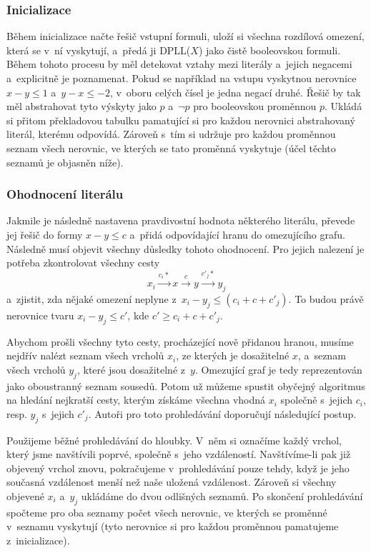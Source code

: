 \subsubsection*{Inicializace}
Během inicializace načte řešič vstupní formuli, uloží si všechna rozdílová omezení, která se v~ní vyskytují, a~předá ji DPLL($X$) jako čistě booleovskou formuli. Během tohoto procesu by měl detekovat vztahy mezi literály a~jejich negacemi a~explicitně je poznamenat. Pokud se například na vstupu vyskytnou nerovnice $x-y \leq 1$ a~$y-x \leq -2$, v~oboru celých čísel je jedna negací druhé. Řešič by tak měl abstrahovat tyto výskyty jako $p$ a~$\neg p$ pro booleovskou proměnnou $p$. Ukládá si přitom překladovou tabulku pamatující si pro každou nerovnici abstrahovaný literál, kterému odpovídá. Zároveň s~tím si udržuje pro každou proměnnou seznam všech nerovnic, ve kterých se tato proměnná vyskytuje (účel těchto seznamů je objasněn níže).

\subsubsection*{Ohodnocení literálu}
Jakmile je následně nastavena pravdivostní hodnota některého literálu, převede jej řešič do formy $x-y \leq c$ a~přidá odpovídající hranu do omezujícího grafu. Následně musí objevit všechny důsledky tohoto ohodnocení. Pro jejich nalezení je potřeba zkontrolovat všechny cesty $$x_i \xrightarrow{c_i*} x \xrightarrow{c} y \xrightarrow{c'_j*} y_j$$ a~zjistit, zda nějaké omezení neplyne z~$x_i - y_j \leq (c_i + c + c'_j)$. To budou právě nerovnice tvaru $x_i - y_j \leq c'$, kde $c' \geq c_i + c + c'_j$. 

Abychom prošli všechny tyto cesty, procházející nově přidanou hranou, musíme nejdřív nalézt seznam všech vrcholů $x_i$, ze kterých je dosažitelné $x$, a~seznam všech vrcholů $y_j$, které jsou dosažitelné z~$y$. Omezující graf je tedy reprezentován jako oboustranný seznam sousedů. Potom už můžeme spustit obyčejný algoritmus na hledání nejkratší cesty, kterým získáme všechna vhodná $x_i$ společně s~jejich $c_i$, resp. $y_j$ s~jejich $c'_j$. Autoři pro toto prohledávání doporučují následující postup.

Použijeme běžné prohledávání do hloubky. V~něm si označíme každý vrchol, který jsme navštívili poprvé, společně s~jeho vzdáleností. Navštívíme-li pak již objevený vrchol znovu, pokračujeme v~prohledávání pouze tehdy, když je jeho současná vzdálenost menší než naše uložená vzdálenost. Zároveň si všechny objevené $x_i$ a~$y_j$ ukládáme do dvou odlišných seznamů. Po skončení prohledávání spočteme pro oba seznamy počet všech nerovnic, ve kterých se proměnné v~seznamu vyskytují (tyto nerovnice si pro každou proměnnou pamatujeme z~inicializace).

